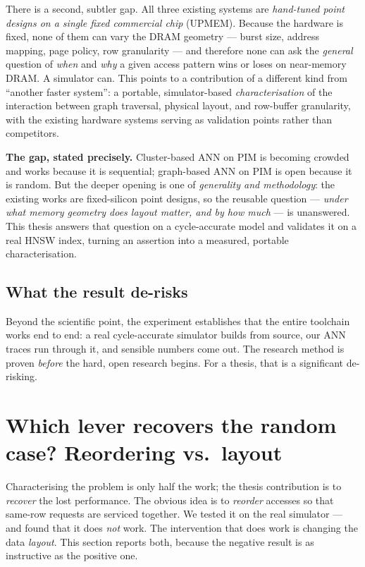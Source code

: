 \documentclass[11pt,a4paper]{article}
\begin{document}
There is a second, subtler gap. All three existing systems are \emph{hand-tuned point designs on a
single fixed commercial chip} (UPMEM). Because the hardware is fixed, none of them can vary the DRAM
geometry --- burst size, address mapping, page policy, row granularity --- and therefore none can ask
the \emph{general} question of \emph{when} and \emph{why} a given access pattern wins or loses on
near-memory DRAM. A simulator can. This points to a contribution of a different kind from ``another
faster system'': a portable, simulator-based \emph{characterisation} of the interaction between graph
traversal, physical layout, and row-buffer granularity, with the existing hardware systems serving as
validation points rather than competitors.

\begin{keybox}
\textbf{The gap, stated precisely.} Cluster-based ANN on PIM is becoming crowded and works because
it is sequential; graph-based ANN on PIM is open because it is random. But the deeper opening is one
of \emph{generality and methodology}: the existing works are fixed-silicon point designs, so the
reusable question --- \emph{under what memory geometry does layout matter, and by how much} --- is
unanswered. This thesis answers that question on a cycle-accurate model and validates it on a real
HNSW index, turning an assertion into a measured, portable characterisation.
\end{keybox}

\subsection{What the result de-risks}

Beyond the scientific point, the experiment establishes that the entire toolchain works end to end:
a real cycle-accurate simulator builds from source, our ANN traces run through it, and sensible
numbers come out. The research method is proven \emph{before} the hard, open research begins. For a
thesis, that is a significant de-risking.

\section{Which lever recovers the random case? Reordering vs.\ layout}
\label{sec:opt}

Characterising the problem is only half the work; the thesis contribution is to \emph{recover} the
lost performance. The obvious idea is to \emph{reorder} accesses so that same-row requests are
serviced together. We tested it on the real simulator --- and found that it does \emph{not} work. The
intervention that does work is changing the data \emph{layout}. This section reports both, because
the negative result is as instructive as the positive one.
\end{document}
